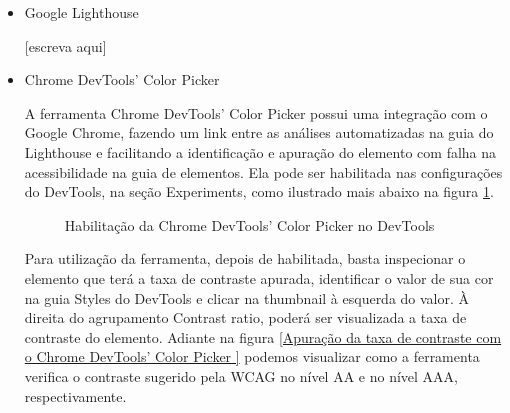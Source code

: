 \documentclass[
	12pt,				%
	openright,			%
	oneside,			%
	a4paper,			%
	chapter=TITLE,		%
	section=TITLE,		%
	subsection=TITLE,	%
	subsubsection=TITLE,%
	english,			%
	brazil				%
	]{abntex2}
\theoremstyle{definition}
\begin{document}
\begin{itemize}

    \item Google Lighthouse
    
[escreva aqui]
    
    \item Chrome DevTools’ Color Picker
    
A ferramenta Chrome DevTools’ Color Picker possui uma integração com o Google Chrome, fazendo um link entre as análises automatizadas na guia do Lighthouse e facilitando a identificação e apuração do elemento com falha na acessibilidade na guia de elementos. Ela pode ser habilitada nas configurações do DevTools, na seção Experiments, como ilustrado mais abaixo na figura \ref{Habilitação da Chrome DevTools’ Color Picker no DevTools}.

\begin{figure}[!h]
\centering
\caption{Habilitação da Chrome DevTools’ Color Picker no DevTools}
\label{Habilitação da Chrome DevTools’ Color Picker no DevTools}
\end{figure}

Para utilização da ferramenta, depois de habilitada, basta inspecionar o elemento que terá a taxa de contraste apurada, identificar o valor de sua cor na guia Styles do DevTools e clicar na thumbnail à esquerda do valor. À direita do agrupamento Contrast ratio, poderá ser visualizada a taxa de contraste do elemento. Adiante na figura \ref{Apuração da taxa de contraste com o Chrome DevTools’ Color Picker } podemos visualizar como a ferramenta verifica o contraste sugerido pela WCAG no nível AA e no nível AAA, respectivamente.


\end{itemize}
\end{document}
